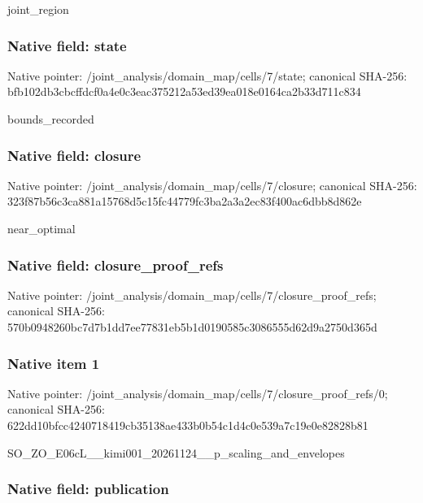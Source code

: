 \documentclass[10pt,a4paper]{article}
\begin{document}
joint\_region


\subsubsection{Native field: state}


Native pointer: /joint\_analysis/domain\_m\allowbreak{}ap/cells/7/state; canonical SHA-256: bfb102db3cbcffdcf0a4e0c3\allowbreak{}eac375212a53ed39ea018e01\allowbreak{}64ca2b33d711c834


bounds\_recorded


\subsubsection{Native field: closure}


Native pointer: /joint\_analysis/domain\_m\allowbreak{}ap/cells/7/closure; canonical SHA-256: 323f87b56c3ca881a15768d5\allowbreak{}c15fc44779fc3ba2a3a2ec83\allowbreak{}f400ac6dbb8d862e


near\_optimal


\subsubsection{Native field: closure\_proof\_refs}


Native pointer: /joint\_analysis/domain\_m\allowbreak{}ap/cells/7/closure\_proof\allowbreak{}\_refs; canonical SHA-256: 570b0948260bc7d7b1dd7ee7\allowbreak{}7831eb5b1d0190585c308655\allowbreak{}5d62d9a2750d365d



\subsubsection{Native item 1}


Native pointer: /joint\_analysis/domain\_m\allowbreak{}ap/cells/7/closure\_proof\allowbreak{}\_refs/0; canonical SHA-256: 622dd10bfcc4240718419cb3\allowbreak{}5138ae433b0b54c1d4c0e539\allowbreak{}a7c19e0e82828b81


SO\_ZO\_E06cL\_\_kimi001\_202\allowbreak{}61124\_\_p\_scaling\_and\_env\allowbreak{}elopes


\subsubsection{Native field: publication}
\end{document}

